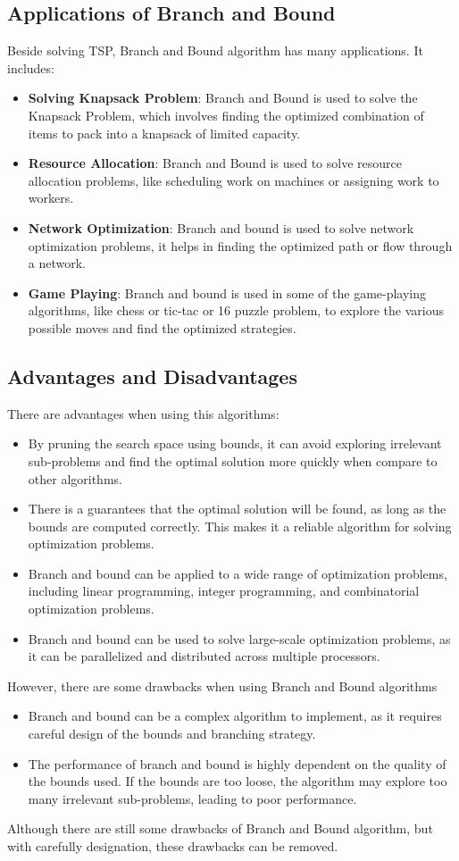 \documentclass[a4paper]{article}
\begin{document}
\subsection{Applications of Branch and Bound}
Beside solving TSP, Branch and Bound algorithm has many applications. It includes:
\begin{itemize}
    \item \textbf{Solving Knapsack Problem}: Branch and Bound is used to solve the Knapsack Problem, which involves finding the optimized combination of items to pack into a knapsack of limited capacity.
    \item \textbf{Resource Allocation}: Branch and Bound is used to solve resource allocation problems, like scheduling work on machines or assigning work to workers. 
    \item \textbf{Network Optimization}: Branch and bound is used to solve network optimization problems, it helps in finding the optimized path or flow through a network.
    \item \textbf{Game Playing}: Branch and bound is used in some of the game-playing algorithms, like chess or tic-tac or 16 puzzle problem, to explore the various possible moves and find the optimized strategies.
\end{itemize}
\subsection{Advantages and Disadvantages}
There are advantages when using this algorithms:
\begin{itemize}
    \item By pruning the search space using bounds, it can avoid exploring irrelevant sub-problems and find the optimal solution more quickly when compare to other algorithms.
    \item There is a guarantees that the optimal solution will be found, as long as the bounds are computed correctly. This makes it a reliable algorithm for solving optimization problems.
    \item Branch and bound can be applied to a wide range of optimization problems, including linear programming, integer programming, and combinatorial optimization problems.
    \item  Branch and bound can be used to solve large-scale optimization problems, as it can be parallelized and distributed across multiple processors.
\end{itemize}
However, there are some drawbacks when using Branch and Bound algorithms
\begin{itemize}
    \item Branch and bound can be a complex algorithm to implement, as it requires careful design of the bounds and branching strategy.
    \item The performance of branch and bound is highly dependent on the quality of the bounds used. If the bounds are too loose, the algorithm may explore too many irrelevant sub-problems, leading to poor performance.
\end{itemize}
Although there are still some drawbacks of Branch and Bound algorithm, but with carefully designation, these drawbacks can be removed.
\end{document}
